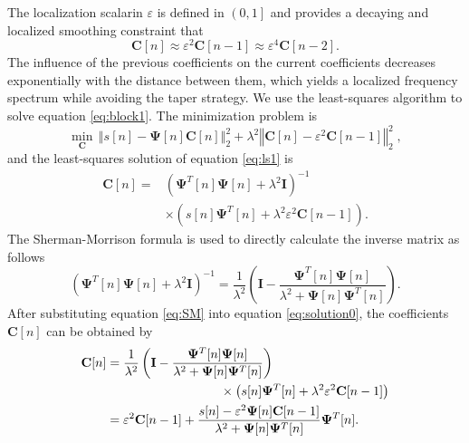 The localization scalarin $\varepsilon$ is defined in
$\left(0,1\right]$ and provides a decaying and localized smoothing
constraint that
\begin{equation}
    \label{eq:approx1}
    \mathbf{C}[n] \approx \varepsilon^2\mathbf{C}[n-1]\approx \varepsilon^4\mathbf{C}[n-2].
\end{equation}
The influence of the previous coefficients on the current coefficients
decreases exponentially with the distance between them, which yields a
localized frequency spectrum while avoiding the taper strategy. We use
the least-squares algorithm to solve equation \ref{eq:block1}. The
minimization problem is
\begin{equation}
	\label{eq:ls1}
	\min_{\mathbf{C}}\,\left\Vert s[n]-\mathbf{\Psi}[n] \mathbf{C}[n] \right\Vert_2^2+ 
	\lambda^2 \left\Vert \mathbf{C}[n]-\varepsilon^2\mathbf{C}[n-1]\right\Vert_2^2\;,
\end{equation}
\noindent and the least-squares solution of equation \ref{eq:ls1}
is \cite[]{Fomel16,Fomel24}
\begin{equation}
	\begin{aligned}
		\label{eq:solution0}
		\mathbf{C}[n]= &\left(\mathbf{\Psi}^T[n]\mathbf{\Psi}[n]+\lambda^2{\mathbf{I}}\right)^{-1} \\
		& \times \left(s[n]\mathbf{\Psi}^T[n]+\lambda^2\varepsilon^2\mathbf{C}[n-1] \right).
	\end{aligned}
\end{equation}
\noindent The Sherman-Morrison formula \cite[]{sherman1950} is used to
directly calculate the inverse matrix as follows
\begin{equation}
	\label{eq:SM}
	\left(\mathbf{\Psi}^T[n]\mathbf{\Psi}[n]+\lambda^2{\mathbf{I}}\right)^{-1}=
	\frac{1}{\lambda^2}\left({\mathbf{I}}-\frac{\mathbf{\Psi}^T[n]\mathbf{\Psi}[n]}{{\lambda^2+\mathbf{\Psi}}[n]\mathbf{\Psi}^T[n]} \right) .
\end{equation}
\noindent After substituting equation \ref{eq:SM} into equation
\ref{eq:solution0}, the coefficients $\mathbf{C}[n]$ can be obtained by
\begin{equation}
	\label{eq:solution1}
	\begin{aligned}
		\mathbf{C}[n] &=\frac{1}{\lambda^2}
		\left(
		{\mathbf{I}}-
		\frac{\mathbf{\Psi}^T[n]\mathbf{\Psi}[n]}
		{{\lambda^2+ \mathbf{\Psi}}[n]\mathbf{\Psi}^T[n]} 
		\right)
		\\&\hspace{0.26\hsize}\times\left(
		s[n]\mathbf{\Psi}^T[n]+\lambda^2\varepsilon^2\mathbf{C}[n-1] 
		\right) \\
		&=\varepsilon^2 \mathbf{C}[n-1] + 
		\frac{s[n]-\varepsilon^2\mathbf{\Psi}[n]\mathbf{C}[n-1]}
		{\lambda^2+\mathbf{\Psi}[n]\mathbf{\Psi}^T[n]}
		\mathbf{\Psi}^T[n].
	\end{aligned}
\end{equation}

